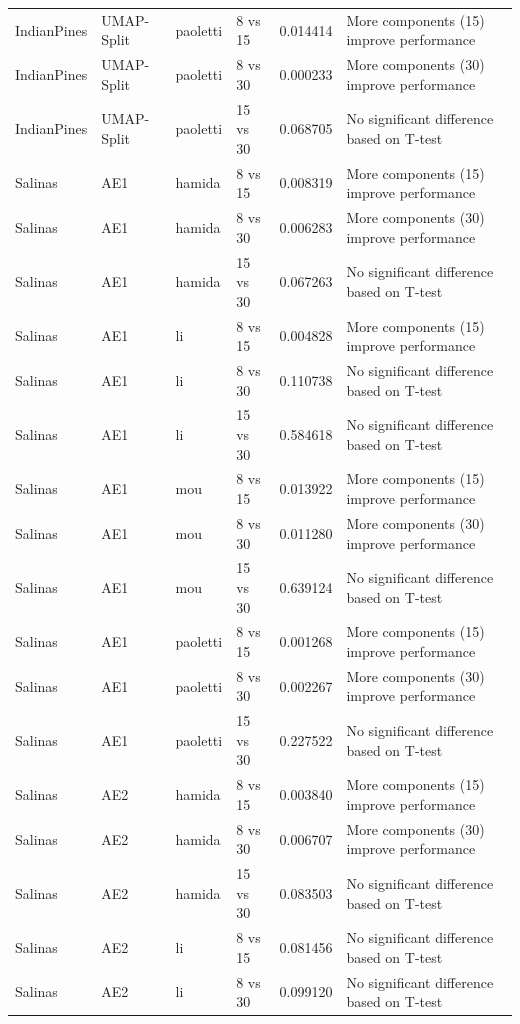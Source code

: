 \begin{longtable}{llllrl}
IndianPines & UMAP-Split & paoletti & 8 vs 15 & 0.014414 & More components (15) improve performance \\
IndianPines & UMAP-Split & paoletti & 8 vs 30 & 0.000233 & More components (30) improve performance \\
IndianPines & UMAP-Split & paoletti & 15 vs 30 & 0.068705 & No significant difference based on T-test \\
Salinas & AE1 & hamida & 8 vs 15 & 0.008319 & More components (15) improve performance \\
Salinas & AE1 & hamida & 8 vs 30 & 0.006283 & More components (30) improve performance \\
Salinas & AE1 & hamida & 15 vs 30 & 0.067263 & No significant difference based on T-test \\
Salinas & AE1 & li & 8 vs 15 & 0.004828 & More components (15) improve performance \\
Salinas & AE1 & li & 8 vs 30 & 0.110738 & No significant difference based on T-test \\
Salinas & AE1 & li & 15 vs 30 & 0.584618 & No significant difference based on T-test \\
Salinas & AE1 & mou & 8 vs 15 & 0.013922 & More components (15) improve performance \\
Salinas & AE1 & mou & 8 vs 30 & 0.011280 & More components (30) improve performance \\
Salinas & AE1 & mou & 15 vs 30 & 0.639124 & No significant difference based on T-test \\
Salinas & AE1 & paoletti & 8 vs 15 & 0.001268 & More components (15) improve performance \\
Salinas & AE1 & paoletti & 8 vs 30 & 0.002267 & More components (30) improve performance \\
Salinas & AE1 & paoletti & 15 vs 30 & 0.227522 & No significant difference based on T-test \\
Salinas & AE2 & hamida & 8 vs 15 & 0.003840 & More components (15) improve performance \\
Salinas & AE2 & hamida & 8 vs 30 & 0.006707 & More components (30) improve performance \\
Salinas & AE2 & hamida & 15 vs 30 & 0.083503 & No significant difference based on T-test \\
Salinas & AE2 & li & 8 vs 15 & 0.081456 & No significant difference based on T-test \\
Salinas & AE2 & li & 8 vs 30 & 0.099120 & No significant difference based on T-test \\

\end{longtable}
